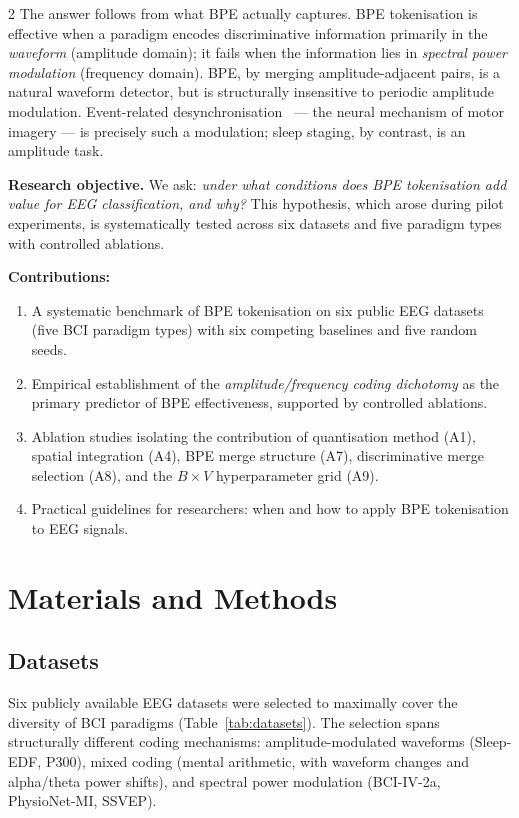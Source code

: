 \documentclass[14pt,a4paper]{extarticle}
\begin{document}
\begin{multicols}{2}
The answer follows from what BPE actually captures.
BPE tokenisation is effective when a paradigm encodes
discriminative information primarily in the
\emph{waveform} (amplitude domain); it fails when the
information lies in \emph{spectral power modulation}
(frequency domain).
BPE, by merging amplitude-adjacent pairs, is a natural
waveform detector, but is structurally insensitive to periodic
amplitude modulation.
Event-related desynchronisation~\cite{pfurtscheller1999erd} ---
the neural mechanism of motor imagery --- is precisely
such a modulation; sleep staging, by contrast, is an amplitude
task.

\textbf{Research objective.}
We ask: \emph{under what conditions does BPE tokenisation add
value for EEG classification, and why?}
This hypothesis, which arose during pilot experiments, is
systematically tested across six datasets and five paradigm
types with controlled ablations.

\textbf{Contributions:}
\begin{enumerate}[leftmargin=*,itemsep=1pt]
  \item A systematic benchmark of BPE tokenisation on six public
        EEG datasets (five BCI paradigm types) with six
        competing baselines and five random seeds.
  \item Empirical establishment of the \emph{amplitude/frequency
        coding dichotomy} as the primary predictor of BPE
        effectiveness, supported by controlled ablations.
  \item Ablation studies isolating the contribution of
        quantisation method (A1), spatial integration (A4),
        BPE merge structure (A7), discriminative merge selection (A8),
        and the $B{\times}V$ hyperparameter grid (A9).
  \item Practical guidelines for researchers: when and how
        to apply BPE tokenisation to EEG signals.
\end{enumerate}

\section*{Materials and Methods}

\subsection*{Datasets}

Six publicly available EEG datasets were selected to maximally
cover the diversity of BCI paradigms (Table~\ref{tab:datasets}).
The selection spans structurally different coding mechanisms:
amplitude-modulated waveforms (Sleep-EDF, P300), mixed
coding (mental arithmetic, with waveform changes and
alpha/theta power shifts), and spectral power modulation
(BCI-IV-2a, PhysioNet-MI, SSVEP).

\end{multicols}
\end{document}
